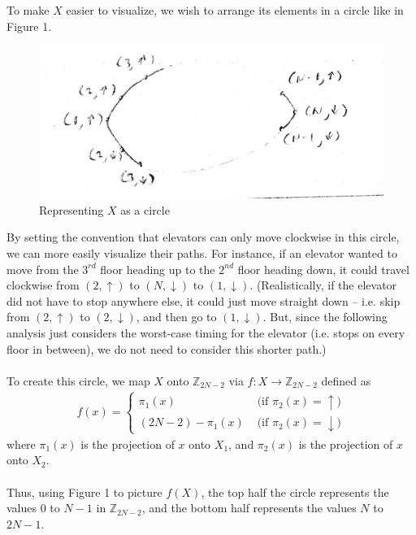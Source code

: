 \documentclass[letterpaper]{article} %
\begin{document}
To make $X$ easier to visualize, we wish to arrange its elements in a circle like in Figure 1.
\begin{figure}
  \centering
    \includegraphics[scale=0.2]{circle}
  \caption{Representing $X$ as a circle}
\end{figure}
By setting the convention that elevators can only move clockwise in this circle, we can more easily visualize their paths. For instance, if an elevator wanted to move from the $3^{rd}$ floor heading up to the $2^{nd}$ floor heading down, it could travel clockwise from $(2, \uparrow)$ to $(N, \downarrow)$ to $(1, \downarrow)$. (Realistically, if the elevator did not have to stop anywhere else, it could just move straight down -- i.e. skip from $(2, \uparrow)$ to $(2, \downarrow)$, and then go to $(1, \downarrow)$. But, since the following analysis just considers the worst-case timing for the elevator (i.e. stops on every floor in between), we do not need to consider this shorter path.)\\\\
To create this circle, we map $X$ onto $\mathbb{Z}_{2N - 2}$ via $f: X \rightarrow \mathbb{Z}_{2N - 2}$ defined as \\
\begin{align*}
    f(x)=\left\{
                \begin{array}{ll}
                  \pi_{1}(x) &\text{ (if $\pi_2(x) = \uparrow$)}\\
                  (2N - 2) - \pi_{1}(x) &\text{ (if $\pi_2(x) = \downarrow$)}
                \end{array}
              \right.
\end{align*}
where $\pi_{1}(x)$ is the projection of $x$ onto $X_1$, and $\pi_{2}(x)$ is the projection of $x$ onto $X_2$. \\\\
Thus, using Figure 1 to picture $f(X)$, the top half the circle represents the values $0$ to $N - 1$ in $\mathbb{Z}_{2N - 2}$, and the bottom half represents the values $N$ to $2N - 1$.
\end{document}
